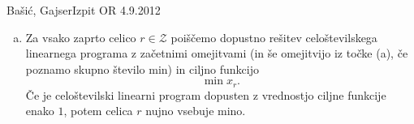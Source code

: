 \begin{naloga}{Bašić, Gajser}{Izpit OR 4.9.2012}
\begin{odgovor}
\begin{enumerate}[(a)]
\item Za vsako zaprto celico $r \in {\mathcal Z}$
poiščemo dopustno rešitev celoštevilskega linearnega programa
z začetnimi omejitvami
(in še omejitvijo iz točke (a), če poznamo skupno število min)
in ciljno funkcijo
$$
\min x_r .
$$
Če je celoštevilski linearni program dopusten
z vrednostjo ciljne funkcije enako $1$,
potem celica $r$ nujno vsebuje mino.
\end{enumerate}
\end{odgovor}
\end{naloga}
